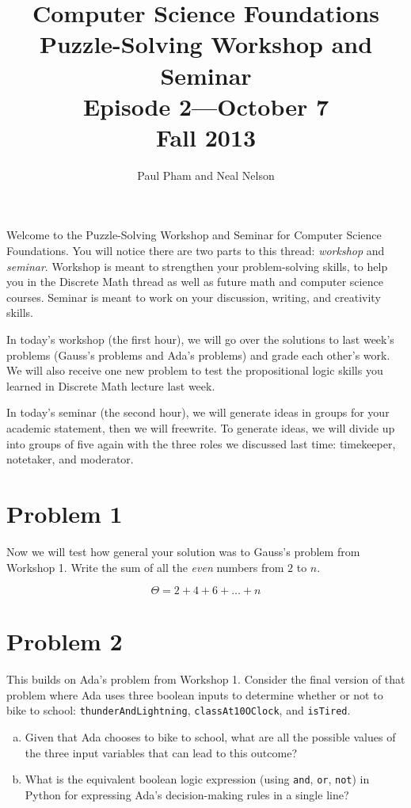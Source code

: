 \documentclass{article}
\title{Computer Science Foundations\\ Puzzle-Solving Workshop and Seminar\\
\large{Episode 2---October 7}\\
Fall 2013}
\author{Paul Pham and Neal Nelson}
\begin{document}
\maketitle

Welcome to the Puzzle-Solving Workshop and Seminar for
Computer Science Foundations. You will notice there are
two parts to this thread: \emph{workshop} and \emph{seminar}.
Workshop is meant to strengthen your problem-solving skills,
to help you in the Discrete Math thread as well as future
math and computer science courses. Seminar is meant to
work on your discussion, writing, and creativity skills.

In today's workshop (the first hour), we will go over the
solutions to last week's problems (Gauss's problems and
Ada's problems) and grade each other's work. We will
also receive one new problem to test the propositional
logic skills you learned in Discrete Math lecture last week.

In today's seminar (the second hour), we will generate ideas
in groups for your academic statement, then we will freewrite.
To generate ideas, we will divide up into groups of five again
with the three roles we discussed last time: timekeeper,
notetaker, and moderator.

\section{Problem 1}

Now we will test how general your solution was to Gauss's problem
from Workshop 1. Write the sum of all the \emph{even} numbers
from $2$ to $n$.

\begin{equation}
\Theta =  2 + 4 + 6 + \ldots + n
\end{equation}

\section{Problem 2}

This builds on Ada's problem from Workshop 1. Consider the final
version of that problem where Ada uses three boolean inputs to
determine whether or not to bike to school:
\texttt{thunderAndLightning}, \texttt{classAt10OClock},
and \texttt{isTired}.

\begin{enumerate}[(a)]
\item
Given that Ada chooses to bike to school, what are all the
possible values of the three input variables that can lead
to this outcome?
\item
What is the equivalent boolean logic expression (using
\texttt{and}, \texttt{or}, \texttt{not}) in Python
for expressing Ada's decision-making rules in a single line?
\end{enumerate}
\end{document}
